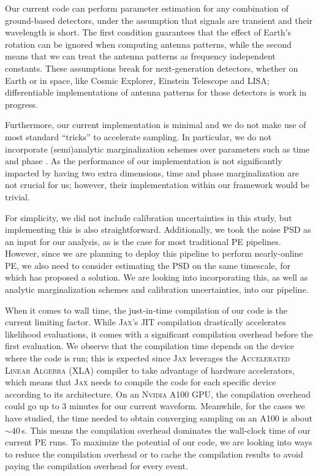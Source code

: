 \documentclass[twocolumn]{aastex631}
\begin{document}
Our current code can perform parameter estimation for any combination of
ground-based detectors, under the assumption that signals are
transient and their wavelength is short. The first condition guarantees that
the effect of Earth's rotation can be ignored when computing antenna patterns,
while the second means that we can treat the antenna patterns as frequency
independent constants. These assumptions break for next-generation detectors,
whether on Earth or in space, like Cosmic Explorer, Einstein Telescope and
LISA; differentiable implementations of antenna patterns for those detectors is
work in progress.

Furthermore, our current implementation is minimal and we do not make use of
most standard ``tricks'' to accelerate sampling.  In particular, we do not
incorporate (semi)analytic marginalization schemes over parameters such as time
and phase \citep{2019PASA...36...10T}. As the performance of our implementation is not
significantly impacted by having two extra dimensions, time and phase
marginalization are not crucial for us;
however, their implementation within our framework would be trivial.

For simplicity, we did not include calibration uncertainties in this study, but
implementing this is also straightforward. Additionally,
we took the noise PSD as an input for our analysis, as is the case for most
traditional PE pipelines.  However, since we are planning to deploy this
pipeline to perform nearly-online PE, we also need to consider estimating the
PSD on the same timescale, for which \cite{Cornish:2021wxy} has proposed a
solution. We are looking into incorporating this, as well as analytic
marginalization schemes and calibration uncertainties, into our pipeline.

When it comes to wall time, the just-in-time compilation of our code is the
current limiting factor.  While \textsc{Jax}'s JIT compilation drastically
accelerates likelihood evaluations, it comes with a significant compilation
overhead before the first evaluation. We observe that the compilation time
depends on the device where the code is run; this is expected since
\textsc{Jax} leverages the \textsc{Accelerated Linear Algebra} (XLA) compiler
to take advantage of hardware accelerators, which means that \textsc{Jax} needs
to compile the code for each specific device according to its architecture. On
an \textsc{Nvidia} A100 GPU, the compilation overhead could go up to 3 minutes
for our current waveform. Meanwhile, for the cases we have studied, the time
needed to obtain converging sampling on an A100 is about $\sim 40\,$s. This
means the compilation overhead dominates the wall-clock time of our current PE
runs. To maximize the potential of our code, we are looking into ways to reduce
the compilation overhead or to cache the compilation results to avoid paying
the compilation overhead for every event.
\end{document}
